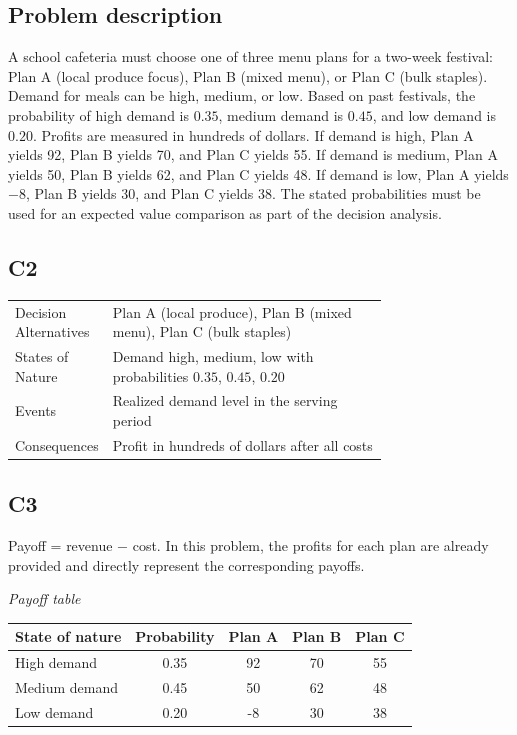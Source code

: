 

	
	\begin{ExamProblems}
		\item
		\subsection*{Problem description}
		A school cafeteria must choose one of three menu plans for a two-week festival: Plan A (local produce focus),
		Plan B (mixed menu), or Plan C (bulk staples). Demand for meals can be high, medium, or low. Based on past festivals, the probability of high demand is $0.35$, medium demand is $0.45$, and low demand is $0.20$. Profits are measured in hundreds of dollars. If demand is high, Plan A yields 92, Plan B yields 70, and Plan C yields 55. If demand is medium, Plan A yields 50, Plan B yields 62, and Plan C yields 48. If demand is low, Plan A yields $-8$, Plan B yields 30, and Plan C yields 38. The stated probabilities must be used for an expected value comparison as part of the decision analysis.

		\subsection*{C2}
		\begin{center}
			\begin{tabular}{l p{0.74\linewidth}}
				\toprule
				Decision Alternatives & Plan A (local produce), Plan B (mixed menu), Plan C (bulk staples) \\
				States of Nature & Demand high, medium, low with probabilities $0.35$, $0.45$, $0.20$ \\
				Events & Realized demand level in the serving period \\
				Consequences & Profit in hundreds of dollars after all costs \\
				\bottomrule
			\end{tabular}
		\end{center}

		\subsection*{C3}
		Payoff = revenue $-$ cost. In this problem, the profits for each plan are already provided and directly represent the corresponding payoffs.
		\begin{center}
			\textit{Payoff table} \\
			\begin{tabular}{l c c c c}
				\toprule
				State of nature & Probability & Plan A & Plan B & Plan C \\
				\midrule
				High demand & 0.35 & 92 & 70 & 55 \\
				Medium demand & 0.45 & 50 & 62 & 48 \\
				Low demand & 0.20 & -8 & 30 & 38 \\
				\bottomrule
			\end{tabular}
		\end{center}


\end{ExamProblems}
